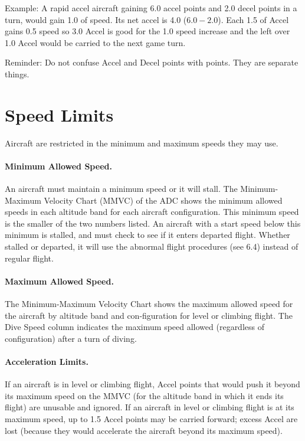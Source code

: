 Example: A rapid accel aircraft gaining 6.0 accel points and 2.0 decel points in a turn, would gain 1.0 of speed. Its net accel is 4.0 ($6.0 - 2.0$). Each 1.5 of Accel gains 0.5 speed so 3.0 Accel is good for the 1.0 speed increase and the left over 1.0 Accel would be carried to the next game turn.

Reminder:  Do not confuse Accel and Decel points with  points. They are separate things.

\section{Speed Limits}

Aircraft are restricted in the minimum and maximum speeds they may use.

\paragraph{Minimum Allowed Speed.} An aircraft must maintain a minimum speed or it will stall. The Minimum-Maximum Velocity Chart (MMVC) of the ADC shows the minimum allowed speeds in each altitude band for each aircraft configuration. This minimum speed is the smaller of the two numbers listed. An aircraft with a start speed below this minimum is stalled, and must check to see if it enters departed flight. Whether stalled or departed, it will use the abnormal flight procedures (see 6.4) instead of regular flight.

\paragraph{Maximum Allowed Speed.} The Minimum-Maximum Velocity Chart shows the maximum allowed speed for the aircraft by altitude band and con-figuration for level or climbing flight. The Dive Speed column indicates the maximum speed allowed (regardless of configuration) after a turn of diving.

\paragraph{Acceleration Limits.} If an aircraft is in level or climbing flight, Accel points that would push it beyond its maximum speed on the MMVC (for the altitude band in which it ends its flight) are unusable and ignored. If an aircraft in level or climbing flight is at its maximum speed, up to 1.5 Accel points may be carried forward; excess Accel are lost (because they would accelerate the aircraft beyond its maximum speed).

